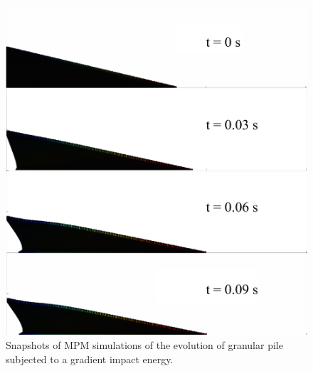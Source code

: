 \begin{figure}[tbph]
\centering
\includegraphics[width=\textwidth]{Gradient_Slope_Profile_200J}
\caption{Snapshots of MPM simulations of the evolution of granular pile 
subjected to a gradient impact energy.}
\label{fig:Gradient_Slope_Profile_200J}
\end{figure}

